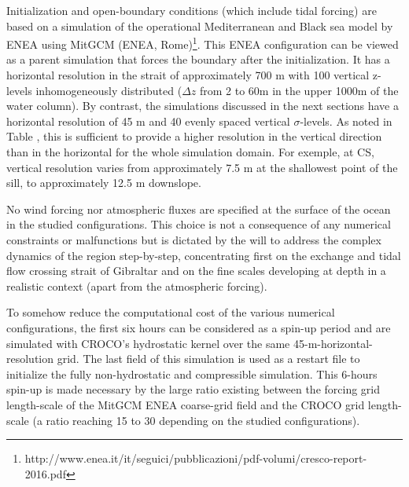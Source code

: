 Initialization and open-boundary conditions (which include tidal forcing) are based on a simulation of the operational Mediterranean and Black sea model by ENEA using MitGCM (ENEA, Rome)\footnote{http://www.enea.it/it/seguici/pubblicazioni/pdf-volumi/cresco-report-2016.pdf}. This ENEA configuration can be viewed as a parent simulation\color{red} that forces the boundary after the initialization\color{black}. It has a horizontal resolution in the strait of approximately 700 m with 100 vertical z-levels inhomogeneously distributed ($\Delta z$ from 2 to 60m in the upper 1000m of the water column). By contrast, the simulations discussed in the next sections have a horizontal resolution of 45 m and 40 evenly spaced vertical $\sigma$-levels. As noted in Table , this is sufficient to provide a higher resolution in the vertical direction than in the horizontal for the whole simulation domain. For exemple, at CS, vertical resolution varies from approximately 7.5 m at the shallowest point of the sill, to approximately 12.5 m downslope.

No wind forcing nor atmospheric fluxes are specified at the surface of the ocean in the studied configurations. This choice is not a consequence of any numerical constraints or malfunctions but is dictated by the will to address the complex dynamics of the region step-by-step, concentrating first on the exchange and tidal flow crossing strait of Gibraltar and on the fine scales developing at depth in a realistic context (apart from the atmospheric forcing).

To somehow reduce the computational cost of the various numerical configurations, the first six hours can be considered as a spin-up period and are simulated with CROCO's hydrostatic kernel over the same 45-m-horizontal-resolution grid. The last field of this simulation is used as a restart file to initialize the fully non-hydrostatic and compressible simulation. This 6-hours spin-up is made necessary by the large ratio existing between the forcing grid length-scale of the MitGCM ENEA coarse-grid field and the CROCO grid length-scale (a ratio reaching 15 to 30 depending on the studied configurations). %

